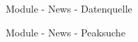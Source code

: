 \begin{frame}{Module - News - Datenquelle}

\end{frame}
\begin{frame}{Module - News - Peaksuche}

\end{frame}